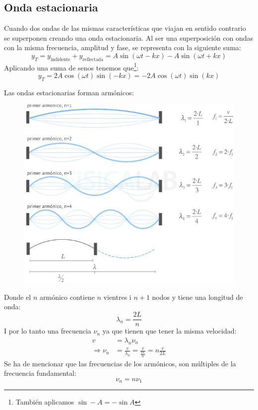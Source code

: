 \documentclass[arial,a4paper,print]{article}
\begin{document}
\subsection{Onda estacionaria}
Cuando dos ondas de las mismas características que viajan en sentido contrario se superponen creando una onda estacionaria. Al ser una superposición con ondas con la misma frecuencia, amplitud y fase, se representa con la siguiente suma:
\begin{equation*}
	y_{T} = y_{\text{indidente}} + y_{\text{reflectada}} = A\sin(\omega t -kx)-A\sin(\omega t + kx)
\end{equation*}
Aplicando una suma de senos tenemos que\footnote{También aplicamos $\sin-A = -\sin A$}:
\begin{equation*}
	y_{T} = 2A\cos(\omega t) \sin(-kx) = -2A\cos(\omega t)\sin(kx)
\end{equation*}

\pagebreak
Las ondas estacionarias forman armónicos: 
\begin{figure}[H]
	\centering
	\includegraphics[width=0.6\linewidth]{figures/onda-estacionaria-cuerda-fija}
	\caption{}
	\label{fig:onda-estacionaria-cuerda-fija}
\end{figure}
Donde el $n$ armónico contiene $n$ vientres i $n+1$ nodos y tiene una longitud de onda:
\begin{equation*}
	\lambda_{n} = \frac{2L}{n}
\end{equation*}
I por lo tanto una frecuencia $\nu_{n}$ ya que tienen que tener la misma velocidad:
\begin{align*}
	v &= \lambda_{n}\nu_{n} \\
	\Rightarrow \nu_{n} &= \frac{v}{\lambda_{n}} = \frac{v}{\frac{2L}{n}} = n\frac{v}{2L}
\end{align*}
Se ha de mencionar que las frecuencias de los armónicos, son múltiples de la frecuencia fundamental:
\begin{equation*}
	\nu_n = n\nu_1
\end{equation*}
\end{document}
